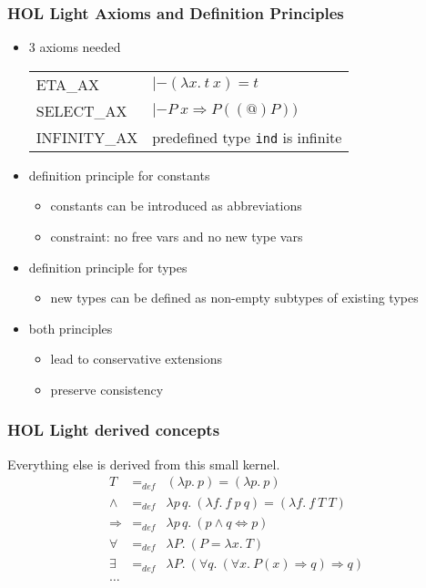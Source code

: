 \newcommand{\tabitem}{~~\llap{\textbullet}~~}

\begin{frame}
\frametitle{HOL Light Axioms and Definition Principles}
\begin{itemize}
\item 3 axioms needed\medskip\\\qquad
\begin{tabular}{ll}
ETA\_AX & $|- (\lambda{}x.\ t\ x) = t$ \\
SELECT\_AX & $|- P\ x \Longrightarrow P ((@) P))$ \\
INFINITY\_AX & predefined type \texttt{ind} is infinite 
\end{tabular}
\item definition principle for constants
\begin{itemize}
\item constants can be introduced as abbreviations
\item constraint: no free vars and no new type vars
\end{itemize}
\item definition principle for types
\begin{itemize}
\item new types can be defined as non-empty subtypes of existing types
\end{itemize}
\item both principles 
\begin{itemize}
\item lead to conservative extensions
\item preserve consistency 
\end{itemize}
\end{itemize}
\end{frame}


\begin{frame}
\frametitle{HOL Light derived concepts}
Everything else is derived from this small kernel. 
\[
\begin{array}{ccl}
T & =_{\textit{def}} & (\lambda{}p.\ p) = (\lambda{}p.\ p)\\
\wedge & =_{\textit{def}} & \lambda{}p\,q.\ (\lambda f.\ f\ p\ q) = (\lambda{}f.\ f\ T\ T) \\
\Longrightarrow & =_{\textit{def}} & \lambda{}p\,q.\ (p \wedge q \Leftrightarrow p) \\
\forall & =_{\textit{def}} & \lambda{}P.\ (P = \lambda{}x.\ T) \\
\exists & =_{\textit{def}} & \lambda{}P.\ (\forall{}q.\ (\forall{}x.\ P(x) \Longrightarrow q) \Longrightarrow q) \\
\ldots \\
\end{array}
\]
\end{frame}


